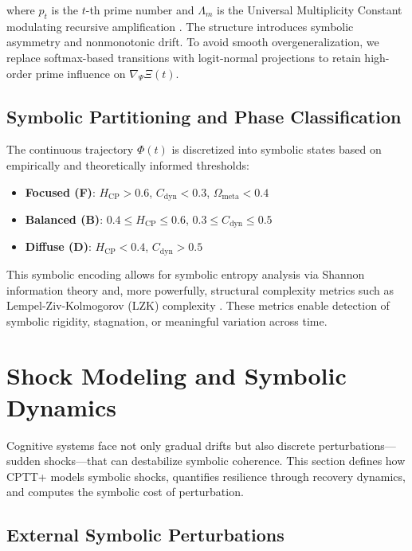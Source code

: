 \documentclass[12pt]{article}
\begin{document}
\noindent where $p_t$ is the $t$-th prime number and $\Lambda_m$ is the Universal Multiplicity Constant modulating recursive amplification \cite{vanGelder2025multiplicity}. The structure introduces symbolic asymmetry and nonmonotonic drift. To avoid smooth overgeneralization, we replace softmax-based transitions with logit-normal projections to retain high-order prime influence on $\nabla_\Psi \Xi(t)$.

\subsection{Symbolic Partitioning and Phase Classification}

The continuous trajectory $\Phi(t)$ is discretized into symbolic states based on empirically and theoretically informed thresholds:

\begin{itemize}
  \item \textbf{Focused (F)}: $H_{\text{CP}} > 0.6$, $C_{\text{dyn}} < 0.3$, $\Omega_{\text{meta}} < 0.4$
  \item \textbf{Balanced (B)}: $0.4 \leq H_{\text{CP}} \leq 0.6$, $0.3 \leq C_{\text{dyn}} \leq 0.5$
  \item \textbf{Diffuse (D)}: $H_{\text{CP}} < 0.4$, $C_{\text{dyn}} > 0.5$
\end{itemize}

This symbolic encoding allows for symbolic entropy analysis via Shannon information theory and, more powerfully, structural complexity metrics such as Lempel-Ziv-Kolmogorov (LZK) complexity \cite{zhang2022symbolic, schmidhuber1997compression}. These metrics enable detection of symbolic rigidity, stagnation, or meaningful variation across time.


\section{Shock Modeling and Symbolic Dynamics}

Cognitive systems face not only gradual drifts but also discrete perturbations—sudden shocks—that can destabilize symbolic coherence. This section defines how CPTT+ models symbolic shocks, quantifies resilience through recovery dynamics, and computes the symbolic cost of perturbation.

\subsection{External Symbolic Perturbations}
\end{document}
